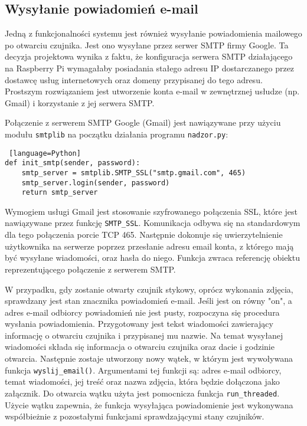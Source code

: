 \documentclass[a4paper,11pt,twoside]{article}
\begin{document}
\subsection{Wysyłanie powiadomień e-mail}
Jedną z funkcjonalności systemu jest również wysyłanie powiadomienia mailowego po otwarciu czujnika. Jest ono wysyłane przez serwer SMTP firmy Google. Ta decyzja projektowa wynika z faktu, że konfiguracja serwera SMTP działającego na Raspberry Pi wymagałaby posiadania stałego adresu IP dostarczanego przez dostawcę usług internetowych oraz domeny przypisanej do tego adresu. Prostszym rozwiązaniem jest utworzenie konta e-mail w zewnętrznej usłudze (np. Gmail) i korzystanie z jej serwera SMTP. 

Połączenie z serwerem SMTP Google (Gmail) jest nawiązywane przy użyciu modułu \texttt{smtplib} na początku działania programu \texttt{nadzor.py}: 
\begin{lstlisting} [language=Python]
def init_smtp(sender, password):
    smtp_server = smtplib.SMTP_SSL("smtp.gmail.com", 465)
    smtp_server.login(sender, password)
    return smtp_server 
\end{lstlisting}
Wymogiem usługi Gmail jest stosowanie szyfrowanego połączenia SSL, które jest nawiązywane przez funkcję \texttt{SMTP{\_}SSL}. Komunikacja odbywa się na standardowym dla tego połączenia porcie TCP 465. Następnie dokonuje się uwierzytelnienie użytkownika na serwerze poprzez przesłanie adresu email konta, z którego mają być wysyłane wiadomości, oraz hasła do niego. Funkcja zwraca referencję obiektu reprezentującego połączenie z serwerem SMTP.

W przypadku, gdy zostanie otwarty czujnik stykowy, oprócz wykonania zdjęcia, sprawdzany jest stan znacznika powiadomień e-mail. Jeśli jest on równy "on", a adres e-mail odbiorcy powiadomień nie jest pusty, rozpoczyna się procedura wysłania powiadomienia. Przygotowany jest tekst wiadomości zawierający informację o otwarciu czujnika i przypisanej mu nazwie. Na temat wysyłanej wiadomości składa się informacja o otwarciu czujnika oraz dacie i godzinie otwarcia. Następnie zostaje utworzony nowy wątek, w którym jest wywoływana funkcja \texttt{wyslij{\_}email()}. Argumentami tej funkcji są: adres e-mail odbiorcy, temat wiadomości, jej treść oraz nazwa zdjęcia, która będzie dołączona jako załącznik. Do otwarcia wątku użyta jest pomocnicza funkcja \texttt{run{\_}threaded}. Użycie wątku zapewnia, że funkcja wysyłająca powiadomienie jest wykonywana współbieżnie z pozostałymi funkcjami sprawdzającymi stany czujników.
\end{document}
